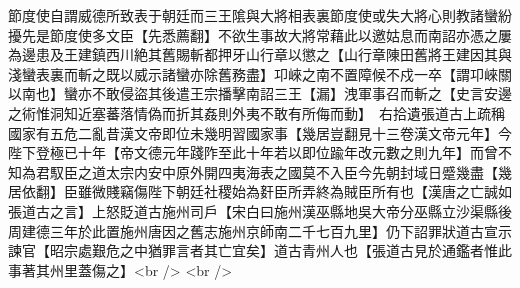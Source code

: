 節度使自謂威德所致表于朝廷而三王隂與大將相表裏節度使或失大將心則教諸蠻紛擾先是節度使多文臣【先悉薦翻】不欲生事故大將常藉此以邀姑息而南詔亦憑之屢為邊患及王建鎮西川絶其舊賜斬都押牙山行章以懲之【山行章陳田舊將王建因其與淺蠻表裏而斬之既以威示諸蠻亦除舊務盡】卭崍之南不置障候不戍一卒【謂卭崍關以南也】蠻亦不敢侵盜其後遣王宗播擊南詔三王【漏】洩軍事召而斬之【史言安邊之術惟洞知近塞蕃落情偽而折其姦則外夷不敢有所侮而動】　右拾遺張道古上疏稱國家有五危二亂昔漢文帝即位未幾明習國家事【幾居豈翻見十三卷漢文帝元年】今陛下登極已十年【帝文德元年踐阼至此十年若以即位踰年改元數之則九年】而曾不知為君馭臣之道太宗内安中原外開四夷海表之國莫不入臣今先朝封域日蹙幾盡【幾居依翻】臣雖微賤竊傷陛下朝廷社稷始為姧臣所弄終為賊臣所有也【漢唐之亡誠如張道古之言】上怒貶道古施州司戶【宋白曰施州漢巫縣地吳大帝分巫縣立沙渠縣後周建德三年於此置施州唐因之舊志施州京師南二千七百九里】仍下詔罪狀道古宣示諫官【昭宗處艱危之中猶罪言者其亡宜矣】道古青州人也【張道古見於通鑑者惟此事著其州里蓋傷之】<br />
<br />
